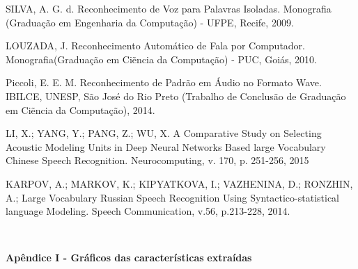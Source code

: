 \documentclass[a4paper,12pt,twoside,openright]{report}
\begin{document}
\begin{thebibliography}{00}
\begin{singlespace}
	SILVA, A. G. d. Reconhecimento de Voz para Palavras Isoladas. Monografia (Gradua{\c c}\~{a}o em Engenharia da Computa{\c c}\~{a}o) - UFPE, Recife, 2009.
\end{singlespace}

\begin{singlespace}
	LOUZADA, J. Reconhecimento Autom\'{a}tico de Fala por Computador. Monografia(Gradua{\c c}\~{a}o em Ci\~{e}ncia da Computa{\c c}\~{a}o) - PUC, Goi\'{a}s, 2010.
\end{singlespace}

\begin{singlespace}
Piccoli, E. E. M. Reconhecimento de Padr\~{a}o em \'{A}udio no Formato Wave. IBILCE, UNESP, S\~{a}o Jos\'{e} do Rio Preto (Trabalho de Conclus\~{a}o de Gradua{\c c}\~{a}o em Ci\~{e}ncia da Computa{\c c}\~{a}o), 2014.
\end{singlespace}

\begin{singlespace}
	LI, X.; YANG, Y.; PANG, Z.; WU, X. A Comparative Study on Selecting Acoustic Modeling Units in Deep Neural Networks Based large Vocabulary Chinese Speech Recognition. Neurocomputing, v. 170, p. 251-256, 2015
\end{singlespace}

\begin{singlespace}
	KARPOV, A.; MARKOV, K.; KIPYATKOVA, I.; VAZHENINA, D.; RONZHIN, A.; Large Vocabulary Russian Speech Recognition Using Syntactico-statistical language Modeling. Speech Communication, v.56, p.213-228, 2014.
\end{singlespace}



\end{thebibliography}
\thispagestyle{myheadings}
\newpage\ \thispagestyle{myheadings} \newpage
\thispagestyle{myheadings}

\appendix

\renewcommand{\chaptername}{Ap\^{e}ndice I - Gr\'{a}ficos das caracter\'{i}sticas extra\'{i}das}


\noindent

{\huge \vspace*{+79pt} \textbf{Ap\^{e}ndice I - Gr\'{a}ficos das caracter\'{i}sticas}}
{\huge \hspace*{+11pt} \textbf{extra\'{i}das}}
\end{document}
